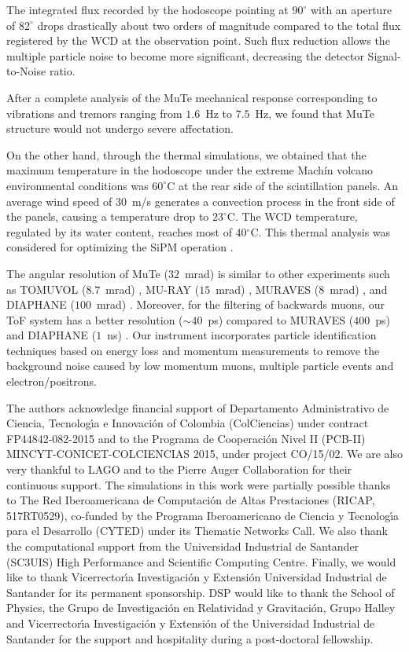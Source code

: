 \documentclass[letterpaper,11pt]{article}
\begin{document}
The integrated flux recorded by the hodoscope pointing at $90^{\circ}$ with an aperture of $82^{\circ}$ drops drastically about two orders of magnitude compared to the total flux registered by the WCD at the observation point. Such flux reduction allows the multiple particle noise to become more significant, decreasing the detector Signal-to-Noise ratio.

After a complete analysis of the MuTe mechanical response corresponding to vibrations and tremors ranging from $1.6$~Hz to $7.5$~Hz, we found that MuTe structure would not undergo severe affectation. 

On the other hand, through the thermal simulations, we obtained that the maximum temperature in the hodoscope under the extreme Mach\'in volcano environmental conditions was $60^{\circ}$C at the rear side of the scintillation panels. An average wind speed of $30$~m/s generates a convection process in the front side of the panels, causing a temperature drop to $23^{\circ}$C. The WCD temperature, regulated by its water content,  reaches most of 40$^{\circ}$C. This thermal analysis was considered for optimizing the SiPM operation \cite{PenaRodriguez2020}. 


The angular resolution of MuTe ($32$~mrad) is similar to other experiments such as TOMUVOL ($8.7$~mrad) \cite{Crloganu2013}, MU-RAY ($15$~mrad) \cite{Ambrosino2014}, MURAVES ($8$~mrad) \cite{Cimmino2017}, and DIAPHANE ($100$~mrad) \cite{Lesparre2012}. Moreover, for the filtering of backwards muons, our ToF system has a better resolution ($\sim 40$~ps) compared to MURAVES ($400$~ps) and DIAPHANE ($1$~ns) \cite{ jourde2013experimental}. Our instrument incorporates particle identification techniques based on energy loss and momentum measurements to remove the background noise caused by low momentum muons, multiple particle events and electron/positrons.



\acknowledgments
The authors acknowledge  financial support of  Departamento Administrativo de Ciencia, Tecnolog\'{\i}a e Innovaci\'on of Colombia (ColCiencias) under contract FP44842-082-2015 and to the Programa de Cooperaci\'on Nivel II (PCB-II) MINCYT-CONICET-COLCIENCIAS 2015, under project CO/15/02.  We are also very thankful to LAGO and to the Pierre Auger Collaboration for their continuous support.  The simulations in this work were partially possible thanks to The Red Iberoamericana de Computaci\'on de Altas Prestaciones (RICAP, 517RT0529), co-funded by the Programa Iberoamericano de Ciencia y Tecnolog\'{\i}a para el Desarrollo (CYTED) under its Thematic Networks Call. We also thank the computational support from the Universidad Industrial de Santander (SC3UIS) High Performance and Scientific Computing Centre. Finally, we would like to thank Vicerrector\'{\i}a Investigaci\'on y Extensi\'on Universidad Industrial de Santander for its permanent sponsorship. DSP would like to thank the School of Physics, the Grupo de Investigación en Relatividad y Gravitación, Grupo Halley and Vicerrector\'{\i}a Investigaci\'on y Extensi\'on of the Universidad Industrial de Santander for the support and hospitality during a post-doctoral fellowship.
\end{document}
